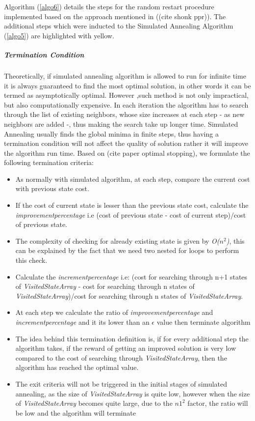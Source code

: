 Algorithm (\ref{algo6}) details the steps for the random restart procedure implemented based on the approach mentioned in ((cite shonk ppr)). The additional steps which were inducted to the Simulated Annealing Algorithm (\ref{algo5}) are highlighted with yellow. 
\subparagraph{Termination Condition}
Theoretically, if simulated annealing algorithm is allowed to run for infinite time it is always guaranteed to find the most optimal solution, in other words it can be termed as asymptotically optimal. However ,such method is not only impractical, but also computationally expensive. In each iteration the algorithm has to search through the list of existing neighbors, whose size increases at each step - as new neighbors are added -, thus making the search take up longer time. Simulated Annealing usually finds the global minima in finite steps, thus having a termination condition will not affect the quality of solution rather it will improve the algorithm run time. Based on (cite paper optimal stopping), we formulate the following termination criteria:
\begin{itemize}
	\item As normally with simulated algorithm, at each step, compare the current cost with previous state cost.
	\item If the cost of current state is lesser than the previous state cost, calculate the \textit{improvementpercentage} i.e (cost of previous state - cost of current step)$/$cost of previous state.
	\item The complexity of checking for already existing state is given by \textit{O($n^{2}$)}, this can be explained by the fact that we need two nested for loops to perform this check. 
	\item Calculate the \textit{incrementpercentage} i.e: (cost for searching through n+1 states of \textit{VisitedStateArray} - cost for searching through n states of \textit{VisitedStateArray})/cost for searching through n states of \textit{VisitedStateArray}.
	\item At each step we calculate the ratio of \textit{improvementpercentage} and \textit{incrementpercentage} and it its lower than an $\epsilon$ value then terminate algorithm
	\item The idea behind this termination definition is, if for every additional step the algorithm takes, if the reward of getting an improved solution is very low compared to the cost of searching through \textit{VisitedStateArray}, then the algorithm has reached the optimal value.
	\item The exit criteria will not be triggered in the initial stages of simulated annealing, as the size of \textit{VisitedStateArray} is quite low, however when the size of \textit{VisitedStateArray} becomes quite large, due to the $n1^{2}$ factor, the ratio will be low and the algorithm will terminate
\end{itemize}

